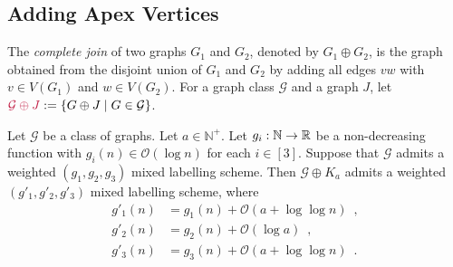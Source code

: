 \documentclass{patmorin}
\makeatletter
\renewcommand{\le}{\leqslant}
\newcommand{\defin}[1]{\emph{\textcolor{brightmaroon}{#1}}}
\def\mathcolor#1#{\@mathcolor{#1}}
\def\@mathcolor#1#2#3{%
  \protect\leavevmode
  \begingroup
    \color#1{#2}#3%
  \endgroup
}
\newcommand{\mathdefin}[1]{\mathcolor{brightmaroon}{#1}}
\newcommand{\NN}{\mathbb{N}}
\newcommand{\Oh}{\calO}
\newcommand{\calG}{\mathcal{G}}
\newcommand{\calK}{\mathcal{K}}
\newcommand{\calO}{\mathcal{O}}
\makeatother
\begin{document}

\subsection{Adding Apex Vertices}

  The \defin{complete join} of two graphs $G_1$ and $G_2$, denoted by \defin{${G_1\oplus G_2}$}, is the graph obtained from the disjoint union of $G_1$ and $G_2$ by adding all edges $vw$ with $v\in V(G_1)$ and $w\in V(G_2)$.
  For a graph class $\calG$ and a graph $J$, 
  let $\mathdefin{\calG\oplus J}:=\{G\oplus J\mid  G\in\calG\}$.%

  \begin{lem}\label{add_apexes}
    Let $\calG$ be a class of graphs. 
    Let $a\in\NN^+$. Let $g_i:\mathbb{N}\to\mathbb{R}$ be a non-decreasing function  with $g_i(n)\in \Oh(\log n)$ for each $i\in[3]$.   
    Suppose that $\calG$ admits a weighted $(g_1,g_2,g_3)$ mixed labelling scheme.
    Then $\calG\oplus K_a$ admits a weighted $(g'_1,g'_2,g'_3)$ mixed labelling scheme, where
    \begin{align*}
        g'_1(n) & = g_1(n)+\Oh(a+\log\log n) \enspace,\\
        g'_2(n) & = g_2(n)+\Oh(\log a) \enspace,\\
        g'_3(n) & = g_3(n)+\Oh(a+\log\log n) \enspace .
    \end{align*}
  \end{lem}
\end{document}
